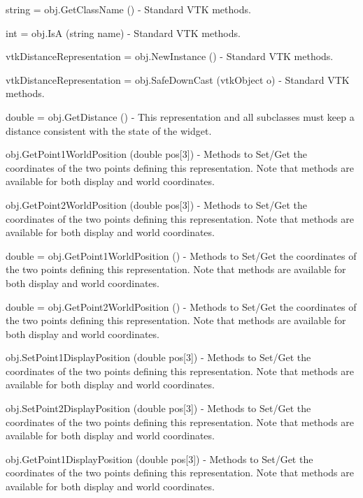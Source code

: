 \begin{DoxyItemize}
\item {\ttfamily string = obj.\-Get\-Class\-Name ()} -\/ Standard V\-T\-K methods.  
\item {\ttfamily int = obj.\-Is\-A (string name)} -\/ Standard V\-T\-K methods.  
\item {\ttfamily vtk\-Distance\-Representation = obj.\-New\-Instance ()} -\/ Standard V\-T\-K methods.  
\item {\ttfamily vtk\-Distance\-Representation = obj.\-Safe\-Down\-Cast (vtk\-Object o)} -\/ Standard V\-T\-K methods.  
\item {\ttfamily double = obj.\-Get\-Distance ()} -\/ This representation and all subclasses must keep a distance consistent with the state of the widget.  
\item {\ttfamily obj.\-Get\-Point1\-World\-Position (double pos\mbox{[}3\mbox{]})} -\/ Methods to Set/\-Get the coordinates of the two points defining this representation. Note that methods are available for both display and world coordinates.  
\item {\ttfamily obj.\-Get\-Point2\-World\-Position (double pos\mbox{[}3\mbox{]})} -\/ Methods to Set/\-Get the coordinates of the two points defining this representation. Note that methods are available for both display and world coordinates.  
\item {\ttfamily double = obj.\-Get\-Point1\-World\-Position ()} -\/ Methods to Set/\-Get the coordinates of the two points defining this representation. Note that methods are available for both display and world coordinates.  
\item {\ttfamily double = obj.\-Get\-Point2\-World\-Position ()} -\/ Methods to Set/\-Get the coordinates of the two points defining this representation. Note that methods are available for both display and world coordinates.  
\item {\ttfamily obj.\-Set\-Point1\-Display\-Position (double pos\mbox{[}3\mbox{]})} -\/ Methods to Set/\-Get the coordinates of the two points defining this representation. Note that methods are available for both display and world coordinates.  
\item {\ttfamily obj.\-Set\-Point2\-Display\-Position (double pos\mbox{[}3\mbox{]})} -\/ Methods to Set/\-Get the coordinates of the two points defining this representation. Note that methods are available for both display and world coordinates.  
\item {\ttfamily obj.\-Get\-Point1\-Display\-Position (double pos\mbox{[}3\mbox{]})} -\/ Methods to Set/\-Get the coordinates of the two points defining this representation. Note that methods are available for both display and world coordinates.  

\end{DoxyItemize}
